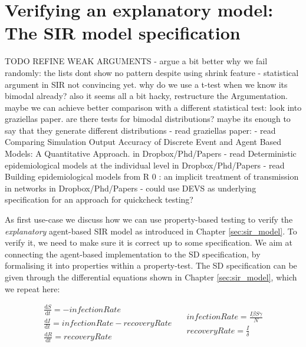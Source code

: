 \chapter{Verifying an explanatory model: \\ The SIR model specification}
\label{ch:prop_explanatory}

TODO REFINE WEAK ARGUMENTS
- argue a bit better why we fail randomly: the lists dont show no pattern despite using shrink feature
- statistical argument in SIR not convincing yet. why do we use a t-test when we know its bimodal already? also it seems all a bit hacky, restructure the Argumentation. maybe we can achieve better comparison with a different statistical test: look into graziellas paper. are there tests for bimodal distributions? maybe its enough to say that they generate different distributions
- read graziellas paper: \cite{figueredo_comparing_2014}
- read Comparing Simulation Output Accuracy of Discrete Event and Agent Based Models: A Quantitative Approach. in Dropbox/Phd/Papers
- read Deterministic epidemiological models at the individual level in Dropbox/Phd/Papers
- read Building epidemiological models from R 0 : an implicit treatment of transmission in networks in Dropbox/Phd/Papers
- could use DEVS as underlying specification for an approach for quickcheck testing?

As first use-case we discuss how we can use property-based testing to verify the \textit{explanatory} agent-based SIR model as introduced in Chapter \ref{sec:sir_model}. To verify it, we need to make sure it is correct up to some specification. We aim at connecting the agent-based implementation to the SD specification, by formalising it into properties within a property-test. The SD specification can be given through the differential equations shown in Chapter \ref{sec:sir_model}, which we repeat here:

\begin{equation}
\begin{split}
\frac{\mathrm d S}{\mathrm d t} = -infectionRate \\
\frac{\mathrm d I}{\mathrm d t} = infectionRate - recoveryRate \\
\frac{\mathrm d R}{\mathrm d t} = recoveryRate 
\end{split}
\quad
\begin{split}
infectionRate = \frac{I \beta S \gamma}{N} \\
recoveryRate = \frac{I}{\delta} 
\end{split}
\end{equation}
\label{eq:sir_delta_rates}

